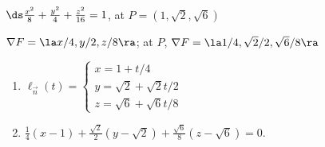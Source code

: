 {$\ds \frac{x^2}{8}+\frac{y^2}4+\frac{z^2}{16}=1$, at $P = (1,\sqrt{2},\sqrt{6})$
}
{
$\nabla F = \la x/4, y/2, z/8\ra$; at $P$, $\nabla F = \la 1/4, \sqrt{2}/2, \sqrt{6}/8\ra$
\begin{enumerate}
	\item $\ell_{\vec n}(t) = \left\{\begin{array}{l} x= 1+ t/4 \\ y = \sqrt{2}+ \sqrt{2}t/2\\ z = \sqrt{6} + \sqrt{6}t/8 \end{array}\right.$
	\item		$\frac14(x-1) + \frac{\sqrt{2}}{2}(y-\sqrt{2}) + \frac{\sqrt{6}}8(z-\sqrt{6}) = 0$.
\end{enumerate}
}